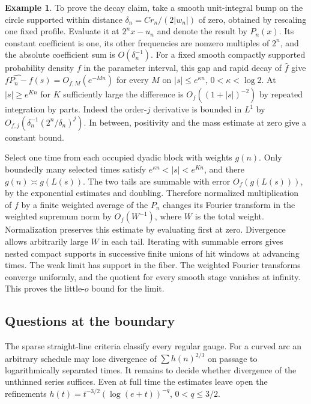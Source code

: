 \documentclass[11pt,a4paper,reqno]{amsart}
\theoremstyle{definition}
\newtheorem{example}[theorem]{Example}
\theoremstyle{remark}
\numberwithin{equation}{section}
\begin{document}
\begin{example}
To prove the decay claim, take a smooth unit-integral bump on
the circle supported within distance
\(\delta_n=C r_n/(2|w_n|)\) of zero, obtained by rescaling one
fixed profile. Evaluate it at \(2^n x-u_n\) and denote the
result by \(P_n(x)\). Its constant coefficient is one, its
other frequencies are nonzero multiples of \(2^n\), and the
absolute coefficient sum is \(O(\delta_n^{-1})\). For a fixed
smooth compactly supported probability density \(f\) in the
parameter interval, this gap and rapid decay of \(\widehat f\)
give \(\widehat{fP_n-f}(s)=O_{f,M}(e^{-Mn})\) for every \(M\)
on \(|s|\le e^{\kappa n}\), \(0<\kappa<\log2\). At
\(|s|\ge e^{Kn}\) for \(K\) sufficiently large the difference
is \(O_f((1+|s|)^{-2})\) by repeated integration by parts.
Indeed the order-\(j\) derivative is bounded in \(L^1\)
by \(O_{f,j}(\delta_n^{-1}(2^n/\delta_n)^j)\).
In between, positivity and the mass estimate at zero give a
constant bound.

Select one time from each occupied dyadic block with weights
\(g(n)\). Only boundedly many selected times satisfy
\(e^{\kappa n}<|s|<e^{Kn}\), and there \(g(n)\asymp g(L(s))\).
The two tails are summable with error \(O_f(g(L(s)))\), by the
exponential estimates and doubling. Therefore normalized
multiplication of \(f\) by a finite weighted average of the
\(P_n\) changes its Fourier transform in the weighted supremum
norm by \(O_f(W^{-1})\), where \(W\) is the total weight.
Normalization preserves this estimate by evaluating first at
zero. Divergence allows arbitrarily large \(W\) in each tail.
Iterating with summable errors gives nested compact supports
in successive finite unions of hit windows at advancing times.
The weak limit has support in the fiber. The weighted Fourier
transforms converge uniformly, and the quotient for every
smooth stage vanishes at infinity. This proves the little-\(o\)
bound for the limit.
\end{example}

\subsection{Questions at the boundary}
The sparse straight-line criteria classify every regular gauge. For a
curved arc an arbitrary schedule may lose divergence of
\(\sum h(n)^{2/3}\) on passage to logarithmically separated times.
It remains to decide whether divergence of the unthinned series suffices.
Even at full time the estimates leave open the refinements
\(h(t)=t^{-3/2}(\log(e+t))^{-q}\), \(0<q\le3/2\).
\end{document}
